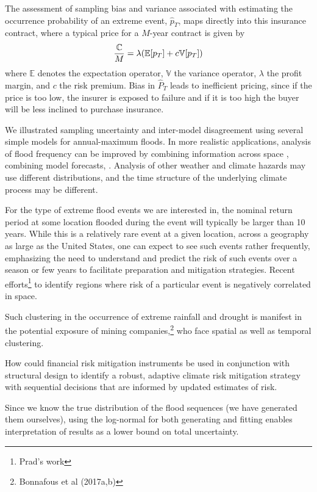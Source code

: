 \documentclass[12pt]{article}
\begin{document}
The assessment of sampling bias and variance associated with estimating the occurrence probability of an extreme event, $\hat{p}_T$, maps directly into this insurance contract, where a typical price for a $M$-year contract is given by
\begin{equation}\label{eq:insurance-price}
  \frac{\mathbb{C}}{M} = \lambda \qty(\mathbb{E} \qty[p_T] + c \mathbb{V} \qty[p_T])
\end{equation}
where $\mathbb{E}$ denotes the expectation operator, $\mathbb{V}$ the variance operator, $\lambda$ the profit margin, and $c$ the risk premium.
Bias in $\hat{P}_T$ leads to inefficient pricing, since if the price is too low, the insurer is exposed to failure and if it is too high the buyer will be less inclined to purchase insurance.

We illustrated sampling uncertainty and inter-model disagreement using several simple models for annual-maximum floods.
In more realistic applications, analysis of flood frequency can be improved by combining information across space \citep{Lima2016,Merz2008a}, combining model forecasts, \etc{}.
Analysis of other weather and climate hazards may use different distributions, and the time structure of the underlying climate process may be different.

For the type of extreme flood events we are interested in, the nominal return period at some location flooded during the event will typically be larger than 10 years.
While this is a relatively rare event at a given location, across a geography as large as the United States, one can expect to see such events rather frequently, emphasizing the need to understand and predict the risk of such events over a season or few years to facilitate preparation and mitigation strategies.
Recent efforts\footnote{Prad's work} to identify regions where risk of a particular event is negatively correlated in space.

Such clustering in the occurrence of extreme rainfall and drought is manifest in the potential exposure of mining companies,\footnote{Bonnafous et al (2017a,b)} who face spatial as well as temporal clustering.

How could  financial risk mitigation instruments be used in conjunction with structural design to identify a robust, adaptive climate risk mitigation strategy with sequential decisions that are informed by updated estimates of risk.

Since we know the true distribution of the flood sequences (we have generated them ourselves), using the log-normal for both generating and fitting enables interpretation of results as a lower bound on total uncertainty.
\end{document}

